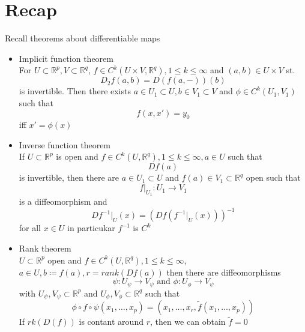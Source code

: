 \documentclass[../main.tex]{subfiles}
\begin{document}
\section{Recap}
Recall theorems about differentiable maps
\begin{itemize}
\item Implicit function theorem\\
	For $U \subset \mathbb{R}^{p},V\subset \mathbb{R}^{q}$, $f\in C^{k}( U\times V, \mathbb{R}^{q}) , 1 \leq k \leq \infty $ and $ ( a,b) \in U\times V$ st.
	\[ 
	D_2 f( a,b) = D( f( a, -) ) ( b) 
	\]
	is invertible. Then there exists $a\in U_1 \subset U,b \in V_1 \subset V$ and $\phi\in C^{k}( U_1,V_1) $ such that
	\[ 
	f( x,x') = y_0
	\]
	iff $x'= \phi( x) $ 

\item Inverse function theorem\\
	If $U \subset \mathbb{R}^{p}$ is open and $f\in C^{k}( U, \mathbb{R}^{q}) , 1 \leq k \leq \infty, a \in U$ such that
	\[ 
	Df( a) 
	\]
	is invertible, then there are $a \in U_1 \subset U$ and $f( a) \in V_1 \subset \mathbb{R}^{q}$  open such that 
	\[ 
	f|_{U_1} : U_1\to V_1
	\]
	is a diffeomorphism and
	\[ 
	Df^{-1}|_U ( x) = ( Df( f^{-1}|_U ( x) ) ) ^{-1}
	\]
	for all $x\in U$ in particukar $f^{-1}$ is $C^{k}$ 
\item Rank theorem\\
	$U \subset \mathbb{R}^{p}$ open and $f\in C^{k}( U, \mathbb{R}^{q}) , 1 \leq k \leq \infty $, $a\in U, b \coloneqq f( a) , r= rank( Df( a) ) $ 
	then there are diffeomorphisms
	\[ 
	\psi: U_\psi\to V_\psi \text{ and } \phi:U_\phi\to V_\psi
	\]
	with $U_\psi,V_\psi\subset \mathbb{R}^{p}$ and $U_\phi,V_\phi \subset \mathbb{R}^{q}$ such that
	\[ 
		\phi\circ f\circ \psi( x_1,\ldots,x_p) = ( x_1,\ldots,x_r, \tilde{f}( x_1,\ldots,x_p) ) 
	\]
	If $rk( D( f) ) $ is contant around $r$, then we can obtain $\tilde f =0$ 
	
\end{itemize}
\end{document}
